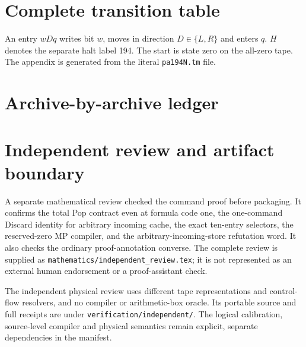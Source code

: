 \documentclass[11pt,letterpaper]{article}
\newcommand{\file}[1]{\texttt{\nolinkurl{#1}}}
\begin{document}
\appendix
\section{Complete transition table}
\label{app:table}
An entry $wDq$ writes bit $w$, moves in direction $D\in\{L,R\}$ and
enters $q$. $H$ denotes the separate halt label 194. The start is state
zero on the all-zero tape. The appendix is generated from the literal
\file{pa194N.tm} file.


\section{Archive-by-archive ledger}


\section{Independent review and artifact boundary}
A separate mathematical review checked the command proof before packaging.
It confirms the total Pop contract even at formula code one, the one-command
Discard identity for arbitrary incoming cache, the exact ten-entry selectors,
the reserved-zero MP compiler, and the arbitrary-incoming-store refutation
word. It also checks the ordinary proof-annotation converse. The complete
review is supplied as \file{mathematics/independent_review.tex}; it is not
represented as an external human endorsement or a proof-assistant check.

The independent physical review uses different tape representations and
control-flow resolvers, and no compiler or arithmetic-box oracle. Its
portable source and full receipts are under \file{verification/independent/}.
The logical calibration, source-level compiler and physical semantics remain
explicit, separate dependencies in the manifest.

\clearpage
\end{document}
